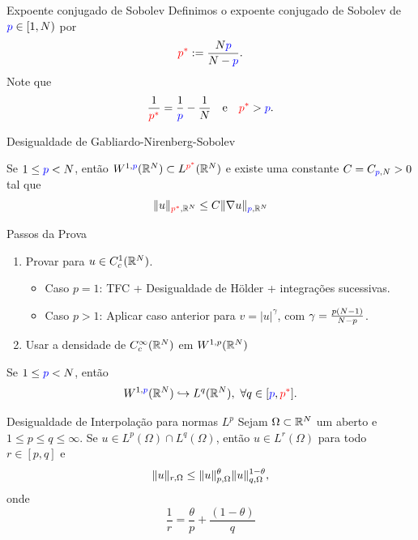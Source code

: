 \begin{frame}{Expoente conjugado de Sobolev}
Definimos o {\color{red}expoente conjugado de Sobolev de} \({\color{blue} p }\in [1,N)\) por
	\[{\color{red} p^\ast }:=\frac{N {\color{blue} p }}{N - {\color{blue} p }}.\]
Note que 
\[\frac{1}{{\color{red} p^\ast }}=\frac{1}{{\color{blue} p }}-\frac{1}{\dm}\ \  \text{ e }\ \  {\color{red}  p^\ast }>{\color{blue} p }.\]


\end{frame}

\begin{frame}{Desigualdade de Gabliardo-Nirenberg-Sobolev}
\begin{teo}\label{GNS}
Se \(1\leq{\color{blue}  p }< N\), então \(W^{1,{\color{blue} p }}(\mathbb{R}^N)\subset L^{{\color{red} p^\ast }}(\mathbb{R}^N)\) e existe uma constante \(C=C_{{\color{blue} p },N}>0\) tal que 
\begin{equation*}
\lVert u\rVert_{{\color{red} p^\ast },\mathbb{R}^N}\leq C\lVert\nabla u\rVert_{{\color{blue} p },\mathbb{R}^N}
\end{equation*}
\end{teo}
\begin{exampleblock}{Passos da Prova}
\begin{enumerate}
\item Provar para \(u\in C^1_c(\mathbb{R}^N)\).
\begin{itemize}
\item Caso \(p=1\): TFC + Desigualdade de Hölder + integrações sucessivas.
\item Caso \(p>1\): Aplicar caso anterior para \(v=|u|^\gamma\), com \(\gamma=\frac{p(N -1)}{N-p}\).
\end{itemize}
\item Usar a densidade de \(C^\infty_c(\mathbb{R}^N)\) em \(W^{1,p}(\mathbb{R}^N)\)
\end{enumerate}
\end{exampleblock}

\end{frame}


\begin{frame}

\begin{corol}
Se \(1\leq {\color{blue} p }<N \), então
\[W^{1,{\color{blue} p }}(\mathbb{R}^N)\hookrightarrow L^q(\mathbb{R}^N), \ \forall q\in [{\color{blue} p },{\color{red} p^\ast }].\]
\end{corol}


\begin{exampleblock}{Desigualdade de Interpolação para normas \(L^p\) {\cite[Appendix B.2(h)]{evans}}}
Sejam \(\Omega\subset \mathbb{R}^N\) um aberto e \(1\leq p\leq q\leq \infty\). Se \(u\in L^p(\Omega)\cap L^q(\Omega)\), então \(u\in L^r(\Omega)\) para todo \(r\in [p,q]\) e 
\[
\lVert u\rVert_{r,\Omega}\leq \lVert u\rVert^\theta_{p,\Omega}\lVert u\rVert_{q,\Omega}^{1-\theta},
\]
onde
\[
\frac{1}{r}=\frac{\theta}{p}+\frac{(1-\theta)}{q}
\]
\end{exampleblock}

\end{frame}

